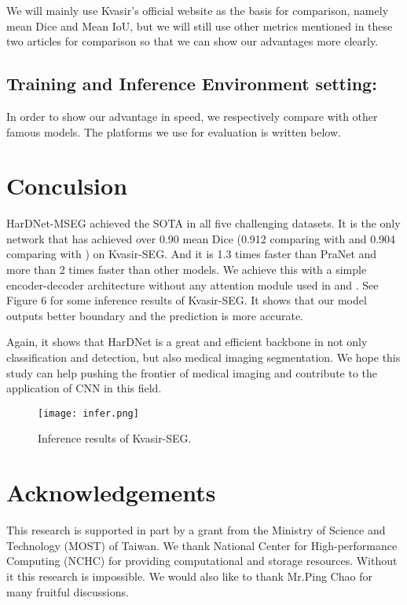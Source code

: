 \documentclass{article}
\begin{document}
\vspace{4mm}
\hspace*{0.5cm}We will mainly use Kvasir's official website as the basis for comparison, namely mean Dice and Mean IoU, but we will still use other metrics mentioned in these two articles for comparison so that we can show our advantages more clearly.

\subsection{Training and Inference Environment setting:
}
\vspace{4mm}
\hspace*{0.5cm}In order to show our advantage in speed, we respectively compare with other famous models. The platforms we use for evaluation is written below.



\section{Conculsion}
\hspace*{0.5cm}HarDNet-MSEG achieved the SOTA in all five challenging datasets. It is the only network that has achieved over 0.90 mean Dice (0.912 comparing with \cite{pranet} and 0.904 comparing with \cite{jha2020real}) on Kvasir-SEG. And it is 1.3 times faster than PraNet and more than 2 times faster than other models. We achieve this with a simple encoder-decoder architecture without any attention module used in \cite{pranet} and \cite{fang2020abc}. See Figure 6 for some inference results of Kvasir-SEG. It shows that our model outputs better boundary and the prediction is more accurate.

\vspace{4mm}
Again, it shows that HarDNet\cite{chao2019hardnet} is a great and efficient backbone in not only classification and detection, but also medical imaging segmentation. We hope this study can help pushing the frontier of medical imaging and contribute to the application of CNN in this field.
\begin{figure}[htb]
\centering
\texttt{[image: infer.png]}
\caption{Inference results of Kvasir-SEG.}
\label{fig:kva}
\end{figure}



\section*{Acknowledgements}
\hspace*{0.5cm}This research is supported in part by a grant from the
Ministry of Science and Technology (MOST) of Taiwan. We thank National Center for High-performance Computing (NCHC) for providing computational and storage resources. Without it this research is impossible. We would also like to thank Mr.Ping Chao for many fruitful discussions.
\end{document}
